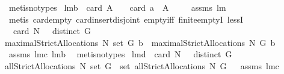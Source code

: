 \begin{isabellebody}
\ {\isacharparenleft}metis{\isacharparenleft}no{\isacharunderscore}types{\isacharparenright}{\isacharparenright}%
\endisatagproof
{\isafoldproof}%
%
\isadelimproof
\isanewline
%
\endisadelimproof
{}\isamarkupfalse%
\ lm{}{}b{\isacharcolon}\ \ {\isachardoublequoteopen}card\ A\ {\isachargreater}\ {}{\isachardoublequoteclose}\ \ {\isachardoublequoteopen}card\ {\isacharparenleft}{\isacharbraceleft}a{\isacharbraceright}\ {\isasymunion}\ A{\isacharparenright}\ {\isachargreater}\ {}{\isachardoublequoteclose}%
\isadelimproof
\ %
\endisadelimproof
%
\isatagproof
{}\isamarkupfalse%
\ assms\ lm{}{}\ \isanewline
{}\isamarkupfalse%
\ {\isacharparenleft}metis\ card{\isacharunderscore}empty\ card{\isacharunderscore}insert{\isacharunderscore}disjoint\ empty{\isacharunderscore}iff\ finite{\isachardot}emptyI\ lessI{\isacharparenright}%
\endisatagproof
{\isafoldproof}%
%
\isadelimproof
%
\endisadelimproof
\isanewline
\isanewline
{}\isamarkupfalse%
\ \ {\isachardoublequoteopen}card\ N\ {\isachargreater}\ {}{\isachardoublequoteclose}\ {\isachardoublequoteopen}distinct\ G{\isachardoublequoteclose}\ \isanewline
{\isachardoublequoteopen}maximalStrictAllocations{\isacharprime}\ N\ {\isacharparenleft}set\ G{\isacharparenright}\ b\ {\isacharequal}\ maximalStrictAllocations\ N\ G\ b{\isachardoublequoteclose}\ \isanewline
%
\isadelimproof
%
\endisadelimproof
%
\isatagproof
{}\isamarkupfalse%
\ assms\ lm{}{}c\ lm{}{}b\ \isamarkupfalse%
\ {\isacharparenleft}metis{\isacharparenleft}no{\isacharunderscore}types{\isacharparenright}{\isacharparenright}%
\endisatagproof
{\isafoldproof}%
%
\isadelimproof
\isanewline
%
\endisadelimproof
\isanewline
\isanewline
\isanewline
{}\isamarkupfalse%
\ lm{}{}d{\isacharcolon}\ \ {\isachardoublequoteopen}card\ N\ {\isachargreater}\ {}{\isachardoublequoteclose}\ {\isachardoublequoteopen}distinct\ G{\isachardoublequoteclose}\ \ \isanewline
{\isachardoublequoteopen}allStrictAllocations{\isacharprime}\ N\ {\isacharparenleft}set\ G{\isacharparenright}\ {\isacharequal}\ set\ {\isacharparenleft}allStrictAllocations\ N\ G{\isacharparenright}{\isachardoublequoteclose}%
\isadelimproof
\ %
\endisadelimproof
%
\isatagproof
{}\isamarkupfalse%
\ assms\ lm{}{}c\ \isamarkupfalse%

\end{isabellebody}
